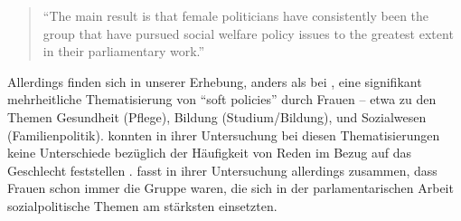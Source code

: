 \documentclass[12pt, 
    twoside=false, 
    bibliography=totoc, 
    numbers=endperiod, 
    headings=normal, 
    toc=chapterentrydotfill
    ]{scrbook}
\begin{document}
\begin{quote}
    \enquote{The main result is that female politicians have consistently been the group that have pursued social welfare policy issues to the greatest extent in their parliamentary work.} \parencite[82]{wangnerud_2000}
\end{quote}

Allerdings finden sich in unserer Erhebung, anders als bei \textcite{back_2014}, eine signifikant mehrheitliche Thematisierung von \enquote{soft policies} \parencite[510]{back_2014} durch Frauen -- etwa zu den Themen Gesundheit (Pflege), Bildung (Studium/Bildung), und Sozialwesen (Familienpolitik). \textcite{back_2014} konnten in ihrer Untersuchung bei diesen Thematisierungen keine Unterschiede bezüglich der Häufigkeit von Reden im Bezug auf das Geschlecht feststellen \parencite[512]{back_2014}. \textcite{wangnerud_2000} fasst in ihrer Untersuchung allerdings zusammen, dass Frauen schon immer die Gruppe waren, die sich in der parlamentarischen Arbeit sozialpolitische Themen am stärksten einsetzten.
\end{document}
